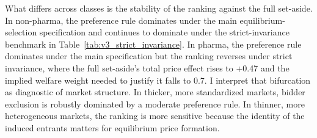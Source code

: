 What differs across classes is the stability of the ranking against the full set-aside. In non-pharma, the preference rule dominates under the main equilibrium-selection specification and continues to dominate under the strict-invariance benchmark in Table~\ref{tab:v3_strict_invariance}. In pharma, the preference rule dominates under the main specification but the ranking reverses under strict invariance, where the full set-aside's total price effect rises to +0.47 and the implied welfare weight needed to justify it falls to 0.7. I interpret that bifurcation as diagnostic of market structure. In thicker, more standardized markets, bidder exclusion is robustly dominated by a moderate preference rule. In thinner, more heterogeneous markets, the ranking is more sensitive because the identity of the induced entrants matters for equilibrium price formation.
